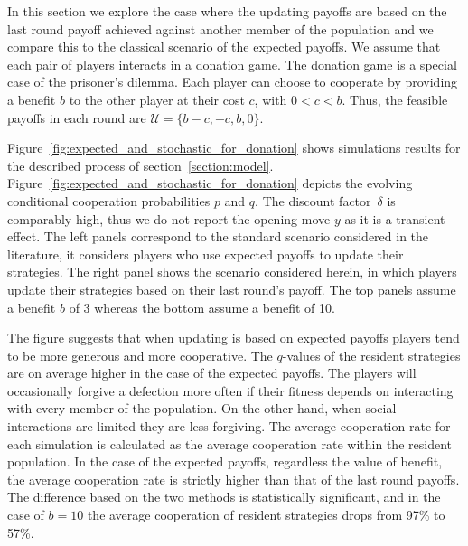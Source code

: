 \documentclass[11pt]{article}
\theoremstyle{plainCl1}
\theoremstyle{plainCl2}
\begin{document}
In this section we explore the case where the updating payoffs are based on the
last round payoff achieved against another member of the population and we
compare this to the classical scenario of the expected payoffs. We assume that
each pair of players interacts in a donation game. The donation game is a
special case of the prisoner's dilemma. Each player can choose to cooperate by
providing a benefit \(b\) to the other player at their cost \(c\), with \(0 < c
< b\). Thus, the feasible payoffs in each round are \(\mathcal{U} = \{b-c, -c,
b, 0\}\).

Figure~\ref{fig:expected_and_stochastic_for_donation} shows simulations results
for the described process of section~\ref{section:model}.
Figure~\ref{fig:expected_and_stochastic_for_donation} depicts the evolving
conditional cooperation probabilities $p$ and $q$. The discount factor~$\delta$
is comparably high, thus we do not report the opening move \(y\) as it is a
transient effect. The left panels correspond to the standard scenario considered
in the literature, it considers players who use expected payoffs to update their
strategies. The right panel shows the scenario considered herein, in which
players update their strategies based on their last round’s payoff. The top
panels assume a benefit \(b\) of 3 whereas the bottom assume a benefit of 10.

The figure suggests that when updating is based on expected payoffs players tend
to be more generous and more cooperative. The $q$-values of the resident
strategies are on average higher in the case of the expected payoffs. The
players will occasionally forgive a defection more often if their fitness
depends on interacting with every member of the population. On the other hand,
when social interactions are limited they are less forgiving. The average
cooperation rate for each simulation is calculated as the average cooperation
rate within the resident population. In the case of the expected payoffs,
regardless the value of benefit, the average cooperation rate is strictly higher
than that of the last round payoffs. The difference based on the two methods is
statistically significant, and in the case of $b=10$ the average cooperation of
resident strategies drops from 97\% to 57\%.
\end{document}
